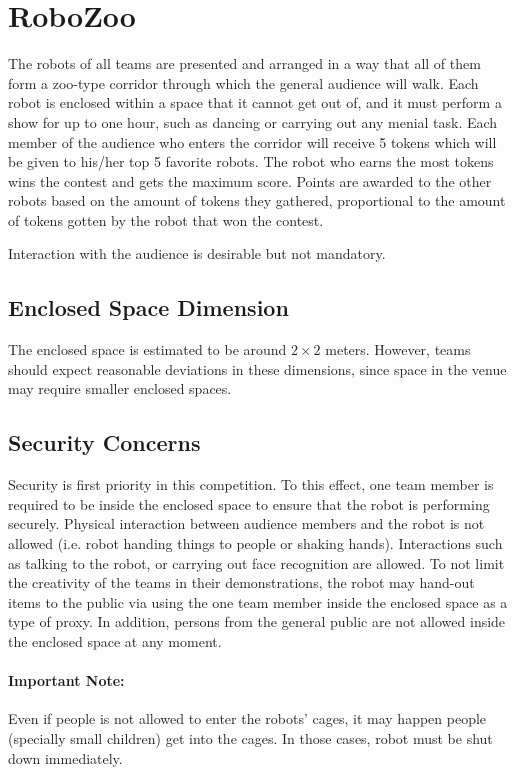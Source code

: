 \section{RoboZoo}
The robots of all teams are presented and arranged in a way that all of them form a zoo-type corridor through which the general audience will walk. Each robot is enclosed within a space that it cannot get out of, and it must perform a show for up to one hour, such as dancing or carrying out any menial task. Each member of the audience who enters the corridor will receive 5 tokens which will be given to his/her top 5 favorite robots. The robot who earns the most tokens wins the contest and gets the maximum score. Points are awarded to the other robots based on the amount of tokens they gathered, proportional to the amount of tokens gotten by the robot that won the contest.

Interaction with the audience is desirable but not mandatory.

\subsection{Enclosed Space Dimension}
The enclosed space is estimated to be around $2 \times 2$ meters. However, teams should expect reasonable deviations in these dimensions, since space in the venue may require smaller enclosed spaces.

\subsection{Security Concerns}
Security is first priority in this competition. To this effect, one team member is required to be inside the enclosed space to ensure that the robot is performing securely. Physical interaction between audience members and the robot is not allowed (i.e. robot handing things to people or shaking hands). Interactions such as talking to the robot, or carrying out face recognition are allowed. To not limit the creativity of the teams in their demonstrations, the robot may hand-out items to the public via using the one team member inside the enclosed space as a type of proxy. In addition, persons from the general public are not allowed inside the enclosed space at any moment.

\paragraph*{Important Note:} Even if people is not allowed to enter the robots' cages, it may happen people (specially small children) get into the cages. In those cases, robot must be shut down immediately.

